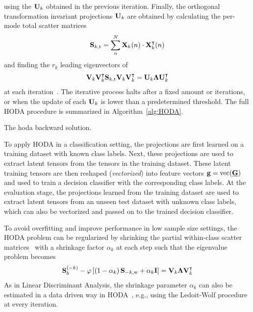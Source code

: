 using the $\mathbf{U}_k$ obtained in the previous iteration.
Finally, the orthogonal transformation invariant projections $\mathbf{U}_k$
are obtained by calculating the
per-mode total scatter matrices
\begin{equation}
  \mathbf{S}_{k,\text{t}} = \sum_n^N\mathbf{X}_k(n)\cdot\mathbf{X}_k^\intercal(n)
\end{equation}
and finding the $r_k$ leading eigenvectors of
\begin{equation}
	\mathbf{V}_k\mathbf{V}_k^\intercal\mathbf{S}_{k,\text{t}}\mathbf{V}_k\mathbf{V}_k^\intercal
	= \mathbf{U}_k\mathbf{\Lambda}\mathbf{U}_k^\intercal
\end{equation}
at each iteration~\cite{Wang2007}.
The iterative process halts after a fixed amount or iterations, or when the
update of each $\mathbf{U}_k$ is lower than a predetermined threshold.
The full HODA procedure is summarized in Algorithm~\ref{alg:HODA}.
\begin{algorithm}
  \caption[The \acs{hoda} backward solution.]{The \ac{hoda} backward solution.}
	\label{alg:HODA}
	
\end{algorithm}


To apply HODA in a classification setting, the projections
are first learned on a training dataset  with known class labels.
Next, these projections are used to extract latent tensors from the
tensors in the training dataset.
These latent training tensors are then reshaped (\emph{vectorized}) into feature vectors
$\mathbf{g} =  \operatorname{vec}(\underline{\mathbf{G}})$ and used to train a decision classifier with the corresponding class labels.
At the evaluation stage, the projections learned from the training dataset are
used to extract latent tensors from an unseen test dataset with unknown class
labels, which can also be vectorized and passed on to the trained decision
classifier.

To avoid overfitting and improve performance in low sample size settings, the
HODA problem can be regularized by shrinking the partial
within-class scatter matrices~\cite{Phan2010} with a shrinkage factor
$\alpha_k$ at each step such that the eigenvalue problem becomes
\begin{equation}
	\mathbf{S}_b^{(-k)} -
	\varphi\left[\left(1-\alpha_k\right)\mathbf{S}_{-k,\text{w}}+\alpha_k\mathbf{I}\right] =
	\mathbf{V}_k\mathbf{\Lambda}\mathbf{V}_k^\intercal
\end{equation}
As in Linear Discriminant Analysis, the shrinkage parameter $\alpha_k$ can
also be estimated in a data driven way in HODA~\cite{Jorajuria2022},
e.g., using the Ledoit-Wolf procedure~\cite{Ledoit2003} at every iteration.


